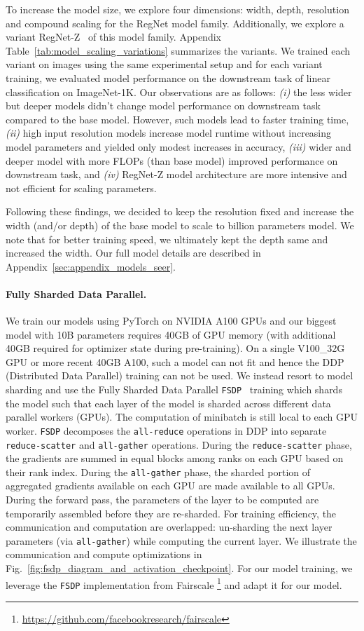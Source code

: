 \documentclass[10pt,twocolumn,letterpaper]{article}
\newcommand{\ImNet}{ImageNet-1K\xspace}
\newcommand{\regnet}{RegNet\xspace}
\begin{document}
To increase the model size, we explore four dimensions: width, depth, resolution and compound scaling for the \regnet model family. Additionally, we explore a variant \regnet-Z~\cite{dollar2021fast} of this model family. Appendix Table~\ref{tab:model_scaling_variations} summarizes the variants. We trained each variant on  images using the same experimental setup and for each variant training, we evaluated model performance on the downstream task of linear classification on \ImNet. Our observations are as follows: \textit{(i)} the less wider but deeper models didn't change model performance on downstream task compared to the base model. However, such models lead to faster training time, \textit{(ii)} high input resolution models increase model runtime without increasing model parameters and yielded only modest increases in accuracy, \textit{(iii)} wider and deeper model with more FLOPs (than base model) improved performance on downstream task, and \textit{(iv)} RegNet-Z model architecture are more intensive and not efficient for scaling parameters.

Following these findings, we decided to keep the resolution fixed and increase the width (and/or depth) of the base model to scale to  billion parameters model. We note that for better training speed, we ultimately kept the depth same and increased the width. Our full model details are described in Appendix~\ref{sec:appendix_models_seer}.

\paragraph{Fully Sharded Data Parallel.}
We train our models using PyTorch on NVIDIA A100 GPUs and our biggest model with 10B parameters requires 40GB of GPU memory (with additional 40GB required for optimizer state during pre-training). On a single V100\_32G GPU or more recent 40GB A100, such a model can not fit and hence the DDP (Distributed Data Parallel) training can not be used. We instead resort to model sharding and use the Fully Sharded Data Parallel \texttt{FSDP}~\cite{rajbhandari2019zero,xu2020automatic} training which shards the model such that each layer of the model is sharded across different data parallel workers (GPUs). The computation of minibatch is still local to each GPU worker. \texttt{FSDP} decomposes the \texttt{all-reduce} operations in DDP into separate \texttt{reduce-scatter} and \texttt{all-gather} operations. During the \texttt{reduce-scatter} phase, the gradients are summed in equal blocks among ranks on each GPU based on their rank index. During the \texttt{all-gather} phase, the sharded portion of aggregated gradients available on each GPU are made available to all GPUs. During the forward pass, the parameters of the layer to be computed are temporarily assembled before they are re-sharded. For training efficiency, the communication and computation are overlapped: un-sharding the next layer parameters (via \texttt{all-gather}) while computing the current layer. We illustrate the communication and compute optimizations in Fig.~\ref{fig:fsdp_diagram_and_activation_checkpoint}. For our model training, we leverage the \texttt{FSDP} implementation from Fairscale \footnote{\url{https://github.com/facebookresearch/fairscale}} and adapt it for our model.
\end{document}
